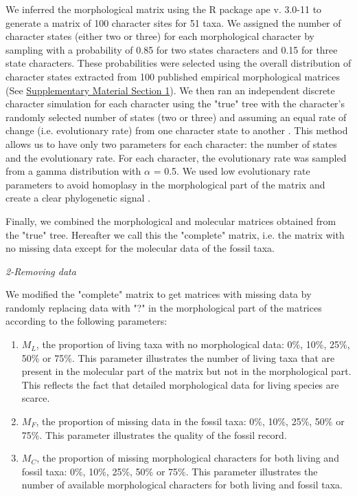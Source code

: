 \documentclass[12pt,letterpaper]{article}
\renewcommand{\subsection}[1]{%
\bigskip
\begin{center}
\begin{large}
\normalfont\itshape #1
\end{large}
\end{center}}
\begin{document}
We inferred the morphological matrix using the R package ape v. 3.0-11 \citep{paradisape:2004} to generate a matrix of 100 character sites for 51 taxa. We assigned the number of character states (either two or three) for each morphological character by sampling with a probability of 0.85 for two states characters and 0.15 for three state characters. These probabilities were selected using the overall distribution of character states extracted from 100 published empirical morphological matrices (See \hyperref[SupplementaryMaterial]{Supplementary Material Section 1}). We then ran an independent discrete character simulation for each character using the "true" tree with the character's randomly selected number of states (two or three) and assuming an equal rate of change (i.e. evolutionary rate) from one character state to another \citep{Pagel22011994}. This method allows us to have only two parameters for each character: the number of states and the evolutionary rate. For each character, the evolutionary rate was sampled from a gamma distribution with $\alpha$ = 0.5. We used low evolutionary rate parameters to avoid homoplasy in the morphological part of the matrix and create a clear phylogenetic signal \citep{wagner2000,davalosintegrating2014,wrightbayesian2014}.

Finally, we combined the morphological and molecular matrices obtained from the "true" tree. Hereafter we call this the "complete" matrix, i.e. the matrix with no missing data except for the molecular data of the fossil taxa.


\subsection{2-Removing data}
\label{Removing_data}
We modified the "complete" matrix to get matrices with missing data by randomly replacing data with "?" in the morphological part of the matrices according to the following parameters:

\begin{enumerate}
\item{$M_{L}$, the proportion of living taxa with no morphological data: 0\%, 10\%, 25\%, 50\% or 75\%.}
This parameter illustrates the number of living taxa that are present in the molecular part of the matrix but not in the morphological part. This reflects the fact that detailed morphological data for living species are scarce.
\item{$M_{F}$, the proportion of missing data in the fossil taxa: 0\%, 10\%, 25\%, 50\% or 75\%.}
This parameter illustrates the quality of the fossil record. 
\item{$M_{C}$, the proportion of missing morphological characters for both living and fossil taxa: 0\%, 10\%, 25\%, 50\% or 75\%. }
This parameter illustrates the number of available morphological characters for both living and fossil taxa.
\end{enumerate}
\end{document}
